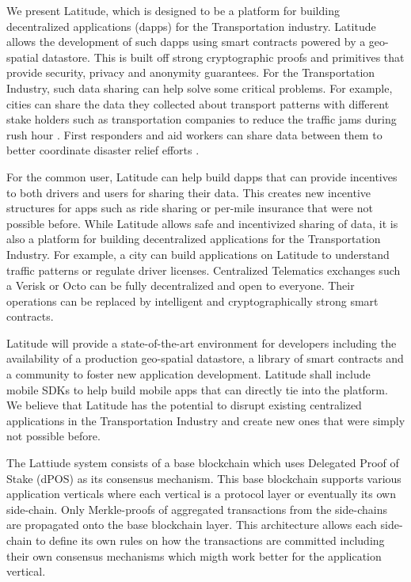 We present Latitude, which is designed to be a platform for building decentralized applications (dapps) for the
Transportation industry. Latitude allows the development of such dapps using smart contracts powered by a
geo-spatial datastore. This is built off strong cryptographic proofs and primitives that provide security, privacy and
anonymity guarantees.  For the Transportation Industry, such data sharing can help solve some critical problems.  For
example, cities can share the data they collected about transport patterns with different stake holders such as
transportation companies to reduce the traffic jams during rush hour \cite{traffic_jam}. First responders and aid
workers can share data between them to better coordinate disaster relief efforts \cite{bharosa_2010}.

For the common user, Latitude can help build dapps that can provide incentives to both drivers and users
for sharing their data. This creates new incentive structures for apps such as ride sharing or per-mile insurance that
were not possible before. While Latitude allows safe and incentivized sharing of data, it is also a platform for
building decentralized applications for the Transportation Industry. For example, a city can build applications on
Latitude to understand traffic patterns or regulate driver licenses. Centralized Telematics exchanges such a Verisk or
Octo can be fully decentralized and open to everyone. Their operations can be replaced by intelligent and
cryptographically strong smart contracts.

Latitude will provide a state-of-the-art environment for developers including the availability of a production
geo-spatial datastore, a library of smart contracts and a community to foster new application development. Latitude
shall include mobile SDKs to help build mobile apps that can directly tie into the platform. We believe that Latitude
has the potential to disrupt existing centralized applications in the Transportation Industry and create new ones that
were simply not possible before.

The Lattiude system consists of a base blockchain which uses Delegated Proof of Stake (dPOS) as its consensus mechanism.
This base blockchain supports various application verticals where each vertical is a protocol layer or eventually its
own side-chain. Only Merkle-proofs of aggregated transactions from the side-chains are propagated onto the base
blockchain layer. This architecture allows each side-chain to define its own rules on how the transactions are committed
including their own consensus mechanisms which migth work better for the application vertical.

